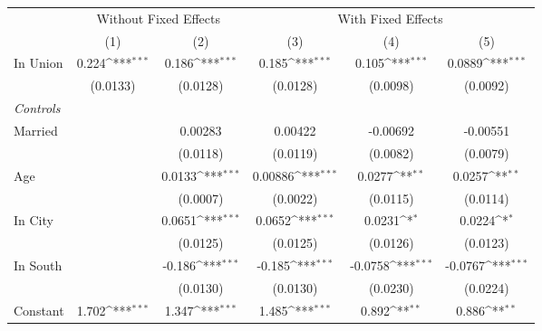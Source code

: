 {
\def\sym#1{\ifmmode^{#1}\else\(^{#1}\)\fi}
\begin{tabular}{l*{5}{c}}
\hline\hline
                    &\multicolumn{2}{c}{Without Fixed Effects}  &\multicolumn{3}{c}{With Fixed Effects}                           \\\cmidrule(lr){2-3}\cmidrule(lr){4-6}
                    &\multicolumn{1}{c}{(1)}         &\multicolumn{1}{c}{(2)}         &\multicolumn{1}{c}{(3)}         &\multicolumn{1}{c}{(4)}         &\multicolumn{1}{c}{(5)}         \\
\hline
In Union            &       0.224\sym{***}&       0.186\sym{***}&       0.185\sym{***}&       0.105\sym{***}&      0.0889\sym{***}\\
                    &    (0.0133)         &    (0.0128)         &    (0.0128)         &    (0.0098)         &    (0.0092)         \\
[1em]
\emph{Controls}     &                     &                     &                     &                     &                     \\
[1em]
Married             &                     &     0.00283         &     0.00422         &    -0.00692         &    -0.00551         \\
                    &                     &    (0.0118)         &    (0.0119)         &    (0.0082)         &    (0.0079)         \\
[1em]
Age                 &                     &      0.0133\sym{***}&     0.00886\sym{***}&      0.0277\sym{**} &      0.0257\sym{**} \\
                    &                     &    (0.0007)         &    (0.0022)         &    (0.0115)         &    (0.0114)         \\
[1em]
In City             &                     &      0.0651\sym{***}&      0.0652\sym{***}&      0.0231\sym{*}  &      0.0224\sym{*}  \\
                    &                     &    (0.0125)         &    (0.0125)         &    (0.0126)         &    (0.0123)         \\
[1em]
In South            &                     &      -0.186\sym{***}&      -0.185\sym{***}&     -0.0758\sym{***}&     -0.0767\sym{***}\\
                    &                     &    (0.0130)         &    (0.0130)         &    (0.0230)         &    (0.0224)         \\
[1em]
Constant            &       1.702\sym{***}&       1.347\sym{***}&       1.485\sym{***}&       0.892\sym{**} &       0.886\sym{**} \\

\end{tabular}}
